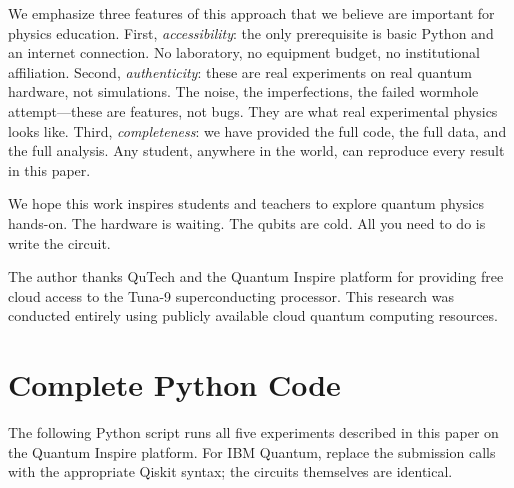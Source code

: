 \documentclass[amsmath,amssymb,reprint,aps,prb]{revtex4-2}
\begin{document}
We emphasize three features of this approach that we believe are
important for physics education.  First, \emph{accessibility}: the
only prerequisite is basic Python and an internet connection.  No
laboratory, no equipment budget, no institutional affiliation.
Second, \emph{authenticity}: these are real experiments on real
quantum hardware, not simulations.  The noise, the imperfections,
the failed wormhole attempt---these are features, not bugs.  They
are what real experimental physics looks like.  Third,
\emph{completeness}: we have provided the full code, the full data,
and the full analysis.  Any student, anywhere in the world, can
reproduce every result in this paper.

We hope this work inspires students and teachers to explore quantum
physics hands-on.  The hardware is waiting.  The qubits are cold.
All you need to do is write the circuit.

\begin{acknowledgments}
The author thanks QuTech and the Quantum Inspire platform for
providing free cloud access to the Tuna-9 superconducting processor.
This research was conducted entirely using publicly available cloud
quantum computing resources.
\end{acknowledgments}


\appendix

\section{Complete Python Code}
\label{app:code}

The following Python script runs all five experiments described in
this paper on the Quantum Inspire platform.  For IBM Quantum, replace
the submission calls with the appropriate Qiskit syntax; the circuits
themselves are identical.
\end{document}
